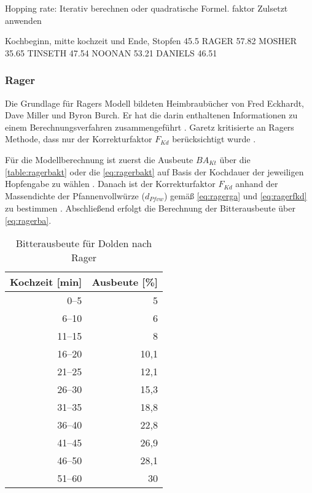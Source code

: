 \documentclass[a4paper,parskip=half]{scrartcl}
\newcommand{\BAKt}{{\mathit{BA}}_{\mathit{Kt}}}
\newcommand{\FKd}{F_{\mathit{Kd}}}
\newcommand{\dPfvw}{d_\mathit{Pfvw}}
\begin{document}
\parencite[63]{Hall1997}
Hopping rate:
Iterativ berechnen oder quadratische
Formel. 
faktor Zulsetzt anwenden

\parencite[65]{Hall1997}
Kochbeginn, mitte kochzeit und Ende, Stopfen
45.5
RAGER  57.82
MOSHER 35.65
TINSETH  47.54
NOONAN 53.21
DANIELS 46.51

\subsubsection*{Rager}

Die Grundlage für Ragers Modell bildeten Heimbraubücher von Fred Eckhardt,
Dave Miller und Byron Burch. Er hat die darin enthaltenen Informationen
zu einem Berechnungsverfahren zusammengeführt \parencite[53]{Rager1990}. 
Garetz kritisierte an Ragers Methode, dass nur der Korrekturfaktor
$\FKd$ berücksichtigt wurde \parencite[134]{Garetz1994}.

Für die Modellberechnung ist zuerst die Ausbeute $\BAKt$ über die \autoref{table:ragerbakt}
oder die \autoref{eq:ragerbakt} auf Basis der Kochdauer der jeweiligen Hopfengabe
zu wählen \parencite{Steinmeyer2021}.
Danach ist der Korrekturfaktor $\FKd$ anhand der Massendichte der
Pfannenvollwürze ($\dPfvw$) gemäß \autoref{eq:ragerga} und \autoref{eq:ragerfkd}
zu bestimmen \parencite[53]{Rager1990}.
Abschließend erfolgt die Berechnung der Bitterausbeute über \autoref{eq:ragerba}.

\begin{table}[H]
\centering
\begin{tabular}{rr}
\toprule
\multicolumn{1}{c}{\textbf{Kochzeit [min]}} & \multicolumn{1}{c}{\textbf{Ausbeute [\%]}} \\
\midrule
0–5             & 5 \\
6–10            & 6 \\
11–15           & 8 \\
16–20           & 10,1 \\
21–25           & 12,1 \\
26–30           & 15,3 \\
31–35           & 18,8 \\
36–40           & 22,8 \\
41–45           & 26,9 \\
46–50           & 28,1 \\
51–60           & 30 \\
\bottomrule
\end{tabular}
\caption{Bitterausbeute für Dolden nach Rager \parencite[54]{Rager1990}}
\label{table:ragerbakt}
\end{table}
\end{document}
